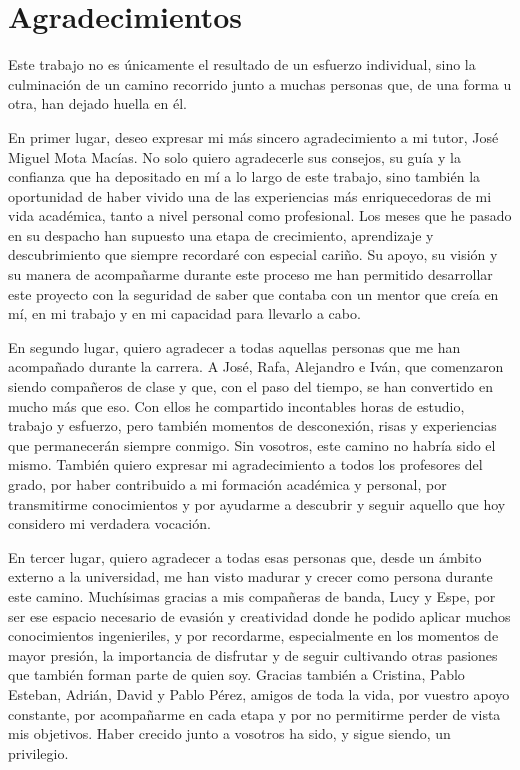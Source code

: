 \newpage{\ }
\thispagestyle{empty}
\chapter*{Agradecimientos}
\label{cap:acknowledgments}

Este trabajo no es únicamente el resultado de un esfuerzo individual, sino la culminación de un camino recorrido junto a muchas personas que, de una forma u otra, han dejado huella en él.

En primer lugar, deseo expresar mi más sincero agradecimiento a mi tutor, José Miguel Mota Macías. No solo quiero agradecerle sus consejos, su guía y la confianza que ha depositado en mí a lo largo de este trabajo, sino también la oportunidad de haber vivido una de las experiencias más enriquecedoras de mi vida académica, tanto a nivel personal como profesional. Los meses que he pasado en su despacho han supuesto una etapa de crecimiento, aprendizaje y descubrimiento que siempre recordaré con especial cariño. Su apoyo, su visión y su manera de acompañarme durante este proceso me han permitido desarrollar este proyecto con la seguridad de saber que contaba con un mentor que creía en mí, en mi trabajo y en mi capacidad para llevarlo a cabo.

En segundo lugar, quiero agradecer a todas aquellas personas que me han acompañado durante la carrera. A José, Rafa, Alejandro e Iván, que comenzaron siendo compañeros de clase y que, con el paso del tiempo, se han convertido en mucho más que eso. Con ellos he compartido incontables horas de estudio, trabajo y esfuerzo, pero también momentos de desconexión, risas y experiencias que permanecerán siempre conmigo. Sin vosotros, este camino no habría sido el mismo. También quiero expresar mi agradecimiento a todos los profesores del grado, por haber contribuido a mi formación académica y personal, por transmitirme conocimientos y por ayudarme a descubrir y seguir aquello que hoy considero mi verdadera vocación.

En tercer lugar, quiero agradecer a todas esas personas que, desde un ámbito externo a la universidad, me han visto madurar y crecer como persona durante este camino. Muchísimas gracias a mis compañeras de banda, Lucy y Espe, por ser ese espacio necesario de evasión y creatividad donde he podido aplicar muchos conocimientos ingenieriles, y por recordarme, especialmente en los momentos de mayor presión, la importancia de disfrutar y de seguir cultivando otras pasiones que también forman parte de quien soy. Gracias también a Cristina, Pablo Esteban, Adrián, David y Pablo Pérez, amigos de toda la vida, por vuestro apoyo constante, por acompañarme en cada etapa y por no permitirme perder de vista mis objetivos. Haber crecido junto a vosotros ha sido, y sigue siendo, un privilegio.

